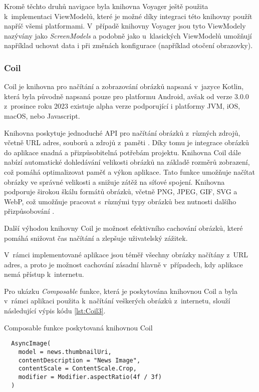 Kromě těchto druhů navigace byla knihovna Voyager ještě použita k~implementaci ViewModelů, které je možné díky integraci této knihovny
použít napříč všemi platformami. V~případě knihovny Voyager jsou tyto ViewModely nazývány jako \textit{ScreenModels} a podobně jako u~klasických
ViewModelů umožňují například uchovat data i při změnách konfigurace (například otočení obrazovky). \cite{voyagerScreeNmodel}


\subsubsection*{Coil}
Coil je knihovna pro načítání a zobrazování obrázků napsaná v~jazyce Kotlin, která byla původně napsaná pouze pro platformu Android, avšak
od verze 3.0.0 z~prosince roku 2023 existuje alpha verze podporující i platformy JVM, iOS, macOS, nebo Javascript. \cite{coil3} 

\medskip

Knihovna poskytuje jednoduché API pro načítání obrázků
z~různých zdrojů, včetně URL adres, souborů a zdrojů z~paměti \cite{coil}. Díky tomu je integrace obrázků do aplikace snadná a přizpůsobitelná potřebám projektu.
Knihovna Coil dále nabízí automatické dohledávání velikosti obrázků na základě rozměrů zobrazení, což pomáhá optimalizovat paměť a výkon aplikace. Tato funkce 
umožňuje načítat obrázky ve správné velikosti a snižuje zátěž na síťové spojení. Knihovna podporuje širokou škálu formátů obrázků, včetně PNG, 
JPEG, GIF, SVG a WebP, což umožňuje pracovat s~různými typy obrázků bez nutnosti dalšího přizpůsobování \cite{coil}.

Další výhodou knihovny Coil je možnost efektivního cachování obrázků, které pomáhá snižovat čas načítání a zlepšuje uživatelský zážitek.

\medskip

V~rámci implementované aplikace jsou téměř všechny obrázky načítány z~URL adres, a proto je možnost cachování zásadní hlavně v~případech, 
kdy aplikace nemá přístup k~internetu.

Pro ukázku \textit{Composable} funkce, která je poskytována knihovnou Coil a byla v~rámci
aplikaci použita k~načítání veškerých obrázků z~internetu, slouží následující výpis kódu \ref{lst:Coil3}.

\begin{listing}[H]
\caption{Composable funkce poskytovaná knihovnou Coil}\label{lst:Coil3}
\begin{verbatim}
  AsyncImage(
    model = news.thumbnailUri,
    contentDescription = "News Image",
    contentScale = ContentScale.Crop,
    modifier = Modifier.aspectRatio(4f / 3f)
  )
\end{verbatim}
\end{listing}
